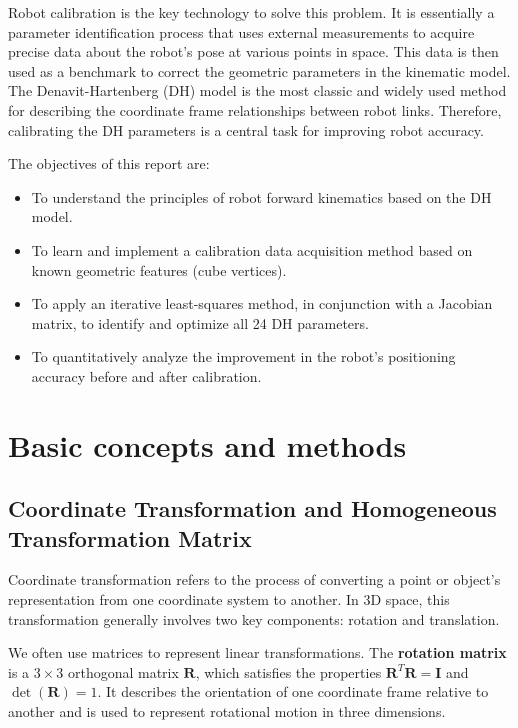 \documentclass[conference]{IEEEtran}
\begin{document}
Robot calibration is the key technology to solve this problem. It is essentially a parameter identification process that uses external measurements to acquire precise data about the robot's pose at various points in space. This data is then used as a benchmark to correct the geometric parameters in the kinematic model. The Denavit-Hartenberg (DH) model is the most classic and widely used method for describing the coordinate frame relationships between robot links. Therefore, calibrating the DH parameters is a central task for improving robot accuracy.

The objectives of this report are:
\begin{itemize}
    \item To understand the principles of robot forward kinematics based on the DH model.
    \item To learn and implement a calibration data acquisition method based on known geometric features (cube vertices).
    \item To apply an iterative least-squares method, in conjunction with a Jacobian matrix, to identify and optimize all 24 DH parameters.
    \item To quantitatively analyze the improvement in the robot's positioning accuracy before and after calibration.
\end{itemize}

\section{Basic concepts and methods}

\subsection{Coordinate Transformation and Homogeneous Transformation Matrix}

Coordinate transformation refers to the process of converting a point or object’s representation from one coordinate system to another. In 3D space, this transformation generally involves two key components: rotation and translation.

We often use matrices to represent linear transformations. The \textbf{rotation matrix} is a $3 \times 3$ orthogonal matrix $\bm{R}$, which satisfies the properties $\bm{R}^T \bm{R} = \bm{I}$ and $\det(\bm{R}) = 1$. It describes the orientation of one coordinate frame relative to another and is used to represent rotational motion in three dimensions.  
\end{document}
